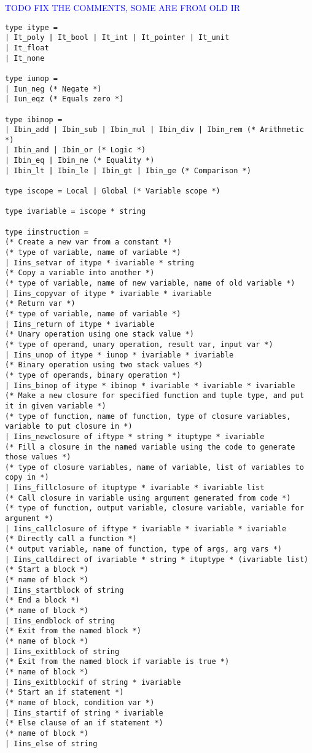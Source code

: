 \documentclass[12pt,twoside,notitlepage]{report}
\newcommand\note[1]{\textcolor{blue}{#1}}
\begin{document}
\note{TODO FIX THE COMMENTS, SOME ARE FROM OLD IR}

\begin{verbatim}
type itype =
| It_poly | It_bool | It_int | It_pointer | It_unit
| It_float
| It_none

type iunop =
| Iun_neg (* Negate *)
| Iun_eqz (* Equals zero *)

type ibinop =
| Ibin_add | Ibin_sub | Ibin_mul | Ibin_div | Ibin_rem (* Arithmetic *)
| Ibin_and | Ibin_or (* Logic *)
| Ibin_eq | Ibin_ne (* Equality *)
| Ibin_lt | Ibin_le | Ibin_gt | Ibin_ge (* Comparison *)

type iscope = Local | Global (* Variable scope *)

type ivariable = iscope * string

type iinstruction =
(* Create a new var from a constant *)
(* type of variable, name of variable *)
| Iins_setvar of itype * ivariable * string
(* Copy a variable into another *)
(* type of variable, name of new variable, name of old variable *)
| Iins_copyvar of itype * ivariable * ivariable
(* Return var *)
(* type of variable, name of variable *)
| Iins_return of itype * ivariable
(* Unary operation using one stack value *)
(* type of operand, unary operation, result var, input var *)
| Iins_unop of itype * iunop * ivariable * ivariable
(* Binary operation using two stack values *)
(* type of operands, binary operation *)
| Iins_binop of itype * ibinop * ivariable * ivariable * ivariable
(* Make a new closure for specified function and tuple type, and put it in given variable *)
(* type of function, name of function, type of closure variables, variable to put closure in *)
| Iins_newclosure of iftype * string * ituptype * ivariable
(* Fill a closure in the named variable using the code to generate those values *)
(* type of closure variables, name of variable, list of variables to copy in *)
| Iins_fillclosure of ituptype * ivariable * ivariable list
(* Call closure in variable using argument generated from code *)
(* type of function, output variable, closure variable, variable for argument *)
| Iins_callclosure of iftype * ivariable * ivariable * ivariable
(* Directly call a function *)
(* output variable, name of function, type of args, arg vars *)
| Iins_calldirect of ivariable * string * ituptype * (ivariable list)
(* Start a block *)
(* name of block *)
| Iins_startblock of string
(* End a block *)
(* name of block *)
| Iins_endblock of string
(* Exit from the named block *)
(* name of block *)
| Iins_exitblock of string
(* Exit from the named block if variable is true *)
(* name of block *)
| Iins_exitblockif of string * ivariable
(* Start an if statement *)
(* name of block, condition var *)
| Iins_startif of string * ivariable
(* Else clause of an if statement *)
(* name of block *)
| Iins_else of string


\end{verbatim}
\end{document}
